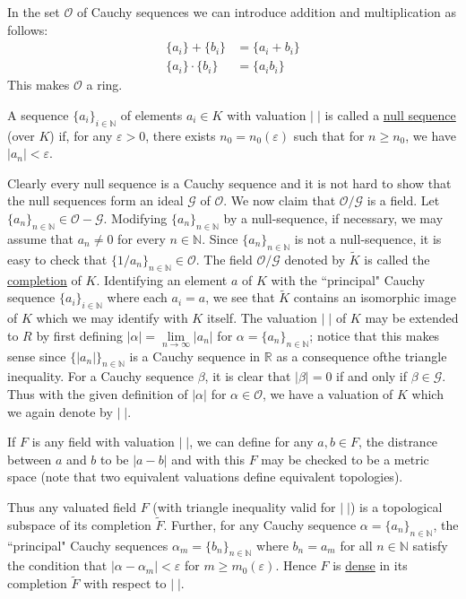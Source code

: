 In the set $\mathscr{O}$ of Cauchy sequences we can introduce 
addition and multiplication as follows:
\begin{align*}
\{a_i\}+\{b_i\} & = \{a_i+b_i\}\\
\{a_i\}\cdot\{b_i\} & = \{a_i b_i\}
\end{align*}
This makes $\mathscr{O}$ a ring.
\begin{defi*}
A sequence $\{a_i\}_{i\in\mathbb{N}}$ of elements $a_i\in K$ with 
valuation $|\;|$ is called a \underline{null sequence} (over $K$) if, 
for any $\varepsilon >0$, there exists $n_0 =n_0 
(\varepsilon)$ such that for $n\geq n_0$, we have 
$|a_n|<\varepsilon$.
\end{defi*}

Clearly every null sequence is a Cauchy sequence and it is not hard to 
show that the null sequences form an ideal $\mathscr{G}$ of 
$\mathscr{O}$. We now claim that $\mathscr{O}/\mathscr{G}$ is a field. 
Let $\{a_n\}_{n\in\mathbb{N}}\in\mathscr{O}-\mathscr{G}$. Modifying 
$\{a_n\}_{n\in\mathbb{N}}$ by a null-sequence, if necessary, we may 
assume that $a_n\neq 0$ for every $n\in\mathbb{N}$. Since 
$\{a_n\}_{n\in\mathbb{N}}$ is not a null-sequence, it is easy to check 
that $\{1/a_n\}_{n\in\mathbb{N}}\in\mathscr{O}$. The field 
$\mathscr{O}/\mathscr{G}$ denoted by $\tilde{K}$ is called the 
\underline{completion} of $K$. Identifying an element $a$ of $K$ with 
the ``principal" Cauchy sequence $\{a_i\}_{i\in\mathbb{N}}$ where each 
$a_i=a$, we see that $\tilde{K}$ contains an isomorphic image of $K$ 
which we may identify with $K$ itself. The valuation $|\;|$ of $K$ may 
be extended to $R$ by first defining 
$|\alpha|=\lim\limits_{n\to\infty}|a_n|$ for $\alpha 
=\{a_n\}_{n\in\mathbb{N}}$; notice that this makes sense since 
$\{|a_n|\}_{n\in\mathbb{N}}$ is a Cauchy sequence in $\mathbb{R}$ as a 
consequence of\pageoriginale the triangle inequality. For a Cauchy 
sequence $\beta$, it is clear that $|\beta|=0$ if and only if 
$\beta\in\mathscr{G}$. Thus with the given definition of $|\alpha|$ 
for $\alpha\in\mathscr{O}$, we have a valuation of $K$ which we again 
denote by $|\;|$.

If $F$ is any field with valuation $|\;|$, we can define for any 
$a,b\in F$, the distrance between $a$ and $b$ to be $|a-b|$ and with 
this $F$ may be checked to be a metric space (note that two equivalent 
valuations define equivalent topologies).

Thus any valuated field $F$ (with triangle inequality valid for 
$|\;|$) is a topological subspace of its completion $\tilde{F}$. 
Further, for any Cauchy sequence $\alpha=\{a_n\}_{n\in\mathbb{N}}$, 
the ``principal" Cauchy sequences $\alpha_m=\{b_n\}_{n\in\mathbb{N}}$ 
where $b_n=a_m$ for all $n\in\mathbb{N}$ satisfy the condition that 
$|\alpha-\alpha_m|<\varepsilon$ for $m\geq m_0(\varepsilon)$. 
Hence $F$ is \underline{dense} in its completion $\tilde{F}$ with 
respect to $|\;|$.

